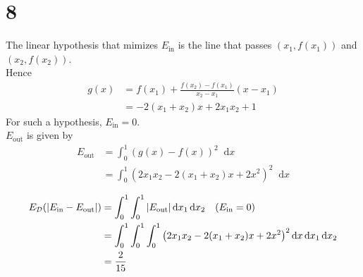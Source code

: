 \documentclass[11pt]{article}
\let\mathbb\relax
\theoremstyle{definition}
\newcommand*\diff{\mathop{}\!\mathrm{d}}
\begin{document}
\section*{8}
The linear hypothesis that mimizes $E_{\text{in}}$ is the line that passes $(x_1, f(x_1))$ and $(x_2, f(x_2))$. \\ 
Hence
\begin{align*}
  g(x) &= f(x_1) + \frac{f(x_2) - f(x_1)}{x_2 - x_1}(x - x_1) \\ 
  &= -2(x_1 + x_2)x + 2x_1x_2 + 1
\end{align*}
For such a hypothesis, $E_{\text{in}} = 0$. \\ 
$E_{\text{out}}$ is given by
\begin{align*}
  E_{\text{out}} &= \int_0^1(g(x) - f(x))^2\diff x \\ 
  &= \int_0^1 \left(2x_1x_2 -2(x_1 + x_2)x + 2x^2\right)^2\diff x \\
\end{align*}
\begin{align*}
  \mathbb{E}_\mathcal{D}(|E_{\text{in}} - E_{\text{out}}|) &= \int^1_0\int^1_0|E_{\text{out}}|\diff x_1\diff x_2\quad(E_{\text{in}} = 0) \\ 
  &= \int^1_0\int^1_0\int^1_0\left(2x_1x_2 -2(x_1 + x_2)x + 2x^2\right)^2\diff x\diff x_1\diff x_2 \\ 
  &= \frac{2}{15}
\end{align*}
\newpage 
\end{document}
